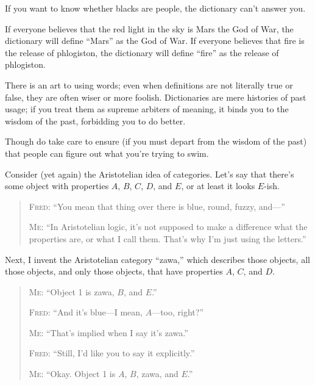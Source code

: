 { If you want to know whether blacks are people, the dictionary
can't answer you.


 If everyone believes that the red light in the sky is Mars the God
of War, the dictionary will define
``Mars'' as the God of War. If
everyone believes that fire is the release of phlogiston, the
dictionary will define ``fire'' as
the release of phlogiston.


 There is an art to using words; even when definitions are not
literally true or false, they are often wiser or more foolish.
Dictionaries are mere histories of past usage; if you treat them as
supreme arbiters of meaning, it binds you to the wisdom of the past,
forbidding you to do better.


 Though do take care to ensure (if you must depart from the wisdom
of the past) that people can figure out what you're
trying to swim.

\myendsectiontext



 Consider (yet again) the Aristotelian idea of categories.
Let's say that there's some object with
properties $A$, $B$, $C$, $D$, and $E$, or at least it looks $E$-ish.

\begin{quotation}

 \textsc{Fred}: ``You mean that thing over there is blue,
round, fuzzy, and---''

{
 \textsc{Me}: ``In Aristotelian logic, it's
not supposed to make a difference what the properties are, or what I
call them. That's why I'm just using
the letters.''}
\end{quotation}


 Next, I invent the Aristotelian category
``zawa,'' which describes those
objects, all those objects, and only those objects, that have
properties $A$, $C$, and $D$.

\begin{quotation}

 \textsc{Me}: ``Object 1 is zawa, $B$, and
$E$.''


 \textsc{Fred}: ``And it's blue---I mean,
$A$---too, right?''


 \textsc{Me}: ``That's implied when I say
it's zawa.''


 \textsc{Fred}: ``Still, I'd like you to
say it explicitly.''

{
 \textsc{Me}: ``Okay. Object 1 is $A$, $B$, zawa, and
$E$.''}
\end{quotation}


}
